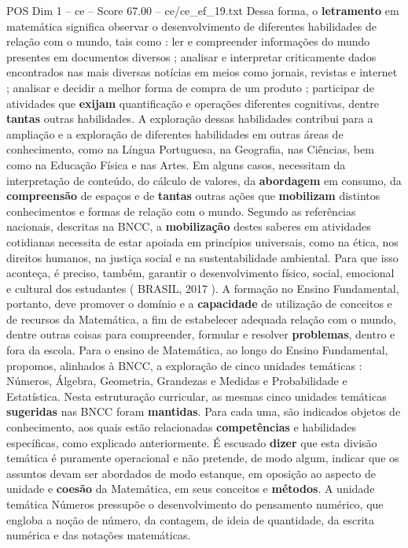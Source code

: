 \begin{textsample}{POS Dim 1 – ce – Score 67.00 – ce/ce\_ef\_19.txt}
Dessa forma, o \textbf{letramento} em matemática significa observar o desenvolvimento de diferentes habilidades de relação com o mundo, tais como : ler e compreender informações do mundo presentes em documentos diversos ; analisar e interpretar criticamente dados encontrados nas mais diversas notícias em meios como jornais, revistas e internet ; analisar e decidir a melhor forma de compra de um produto ; participar de atividades que \textbf{exijam} quantificação e operações diferentes cognitivas, dentre \textbf{tantas} outras habilidades.
A exploração dessas habilidades contribui para a ampliação e a exploração de diferentes habilidades em outras áreas de conhecimento, como na Língua Portuguesa, na Geografia, nas Ciências, bem como na Educação Física e nas Artes.
Em alguns casos, necessitam da interpretação de conteúdo, do cálculo de valores, da \textbf{abordagem} em consumo, da \textbf{compreensão} de espaços e de \textbf{tantas} outras ações que \textbf{mobilizam} distintos conhecimentos e formas de relação com o mundo.
Segundo as referências nacionais, descritas na BNCC, a \textbf{mobilização} destes saberes em atividades cotidianas necessita de estar apoiada em princípios universais, como na ética, nos direitos humanos, na justiça social e na sustentabilidade ambiental.
Para que isso aconteça, é preciso, também, garantir o desenvolvimento físico, social, emocional e cultural dos estudantes ( BRASIL, 2017 ).
A formação no Ensino Fundamental, portanto, deve promover o domínio e a \textbf{capacidade} de utilização de conceitos e de recursos da Matemática, a fim de estabelecer adequada relação com o mundo, dentre outras coisas para compreender, formular e resolver \textbf{problemas}, dentro e fora da escola.
Para o ensino de Matemática, ao longo do Ensino Fundamental, propomos, alinhados à BNCC, a exploração de cinco unidades temáticas : Números, Álgebra, Geometria, Grandezas e Medidas e Probabilidade e Estatística.
Nesta estruturação curricular, as mesmas cinco unidades temáticas \textbf{sugeridas} nas BNCC foram \textbf{mantidas}.
Para cada uma, são indicados objetos de conhecimento, aos quais estão relacionadas \textbf{competências} e habilidades específicas, como explicado anteriormente.
É escusado \textbf{dizer} que esta divisão temática é puramente operacional e não pretende, de modo algum, indicar que os assuntos devam ser abordados de modo estanque, em oposição ao aspecto de unidade e \textbf{coesão} da Matemática, em seus conceitos e \textbf{métodos}.
A unidade temática Números pressupõe o desenvolvimento do pensamento numérico, que engloba a noção de número, da contagem, de ideia de quantidade, da escrita numérica e das notações matemáticas.

\end{textsample}
